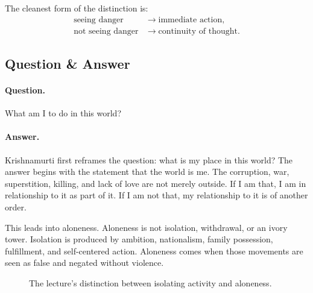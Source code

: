 The cleanest form of the distinction is:
\begin{align}
\text{seeing danger} &\longrightarrow \text{immediate action},\\
\text{not seeing danger} &\longrightarrow \text{continuity of thought}.
\end{align}

\subsection{Question \& Answer}

\paragraph{Question.}
What am I to do in this world?

\paragraph{Answer.}
Krishnamurti first reframes the question: what is my place in this world? The answer begins with the statement that the world is me. The corruption, war, superstition, killing, and lack of love are not merely outside. If I am that, I am in relationship to it as part of it. If I am not that, my relationship to it is of another order.

This leads into aloneness. Aloneness is not isolation, withdrawal, or an ivory tower. Isolation is produced by ambition, nationalism, family possession, fulfillment, and self-centered action. Aloneness comes when those movements are seen as false and negated without violence.

\begin{figure}
\centering
{}
\caption{The lecture's distinction between isolating activity and aloneness.}
\end{figure}

